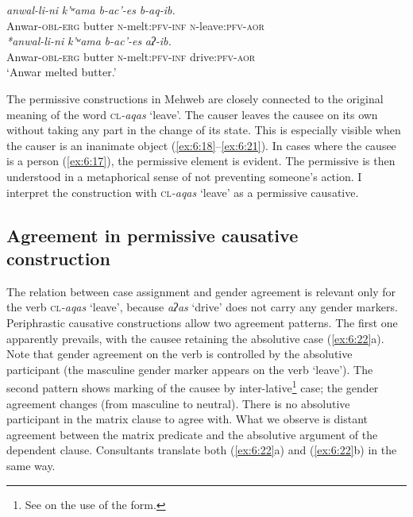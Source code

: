 ﻿\documentclass[output=paper]{langsci/langscibook}
\begin{document}
\ea \label{ex:6:21} %
\ea %
\gll \emph{anwal-li-ni} \emph{k'ʷama} \emph{b-ac'-es} \emph{b-aq-ib.} \\
Anwar-\textsc{obl}-\textsc{erg} butter \textsc{n}-melt:\textsc{pfv}-\textsc{inf} \textsc{n}-leave:\textsc{pfv}-\textsc{aor} \\

\ex %
\gll \emph{*anwal-li-ni} \emph{k'ʷama} \emph{b-ac'-es} \emph{aʔ-ib.}\\
Anwar-\textsc{obl}-\textsc{erg} butter \textsc{n}-melt:\textsc{pfv}-\textsc{inf} drive:\textsc{pfv}-\textsc{aor}\\
\glt `Anwar melted butter.'
\z
\z


The permissive constructions in Mehweb are closely connected to the
original meaning of the word \textsc{cl}\emph{-aqas} `leave'. The causer
leaves the causee on its own without taking any part in the change of
its state. This is especially visible when the causer is an inanimate
object (\ref{ex:6:18}–\ref{ex:6:21}). In cases where the causee is a person (\ref{ex:6:17}), the
permissive element is evident. The permissive is then understood in a
metaphorical sense of not preventing someone's action. I interpret the
construction with \textsc{cl}\emph{-aqas} `leave' as a permissive
causative.
%


\subsection{Agreement in permissive causative construction}\label{Agreement-in-permissive-causative-construction}

The relation between case assignment and gender agreement is relevant
only for the verb \textsc{cl}\emph{-aqas} `leave', because \emph{aʔas}
`drive' does not carry any gender markers. Periphrastic causative
constructions allow two agreement patterns. The first one apparently
prevails, with the causee retaining the absolutive case (\ref{ex:6:22}a). Note that
gender agreement on the verb is controlled by the absolutive participant
(the masculine gender marker appears on the verb `leave'). The
second pattern shows marking of the causee by
inter-lative\footnote{See \citet{chechuro2019} on the use of the
  form.} case; the gender agreement changes (from masculine to neutral). There is no absolutive
participant in the matrix clause to agree with. What we observe is
distant agreement between the matrix predicate and the absolutive
argument of the dependent clause. Consultants translate both (\ref{ex:6:22}a) and
(\ref{ex:6:22}b) in the same way.
\end{document}
